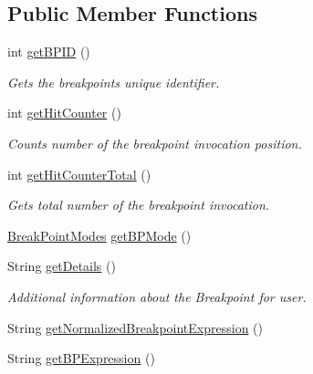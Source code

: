 \subsection*{Public Member Functions}
\begin{DoxyCompactItemize}
\item 
int \hyperlink{interfacegov_1_1nasa_1_1jpf_1_1inspector_1_1interfaces_1_1_break_point_status_ae3bec2407b923c2e640eec695a9bbe64}{get\+B\+P\+ID} ()
\begin{DoxyCompactList}\small\item\em Gets the breakpoint\textquotesingle{}s unique identifier. \end{DoxyCompactList}\item 
int \hyperlink{interfacegov_1_1nasa_1_1jpf_1_1inspector_1_1interfaces_1_1_break_point_status_aa58761be50e0e0ecb7d6a7fb3ded8bf9}{get\+Hit\+Counter} ()
\begin{DoxyCompactList}\small\item\em Counts number of the breakpoint invocation position. \end{DoxyCompactList}\item 
int \hyperlink{interfacegov_1_1nasa_1_1jpf_1_1inspector_1_1interfaces_1_1_break_point_status_abdf0e6a13c2758d552a9d74f1dbc33e2}{get\+Hit\+Counter\+Total} ()
\begin{DoxyCompactList}\small\item\em Gets total number of the breakpoint invocation. \end{DoxyCompactList}\item 
\hyperlink{enumgov_1_1nasa_1_1jpf_1_1inspector_1_1server_1_1breakpoints_1_1_break_point_modes}{Break\+Point\+Modes} \hyperlink{interfacegov_1_1nasa_1_1jpf_1_1inspector_1_1interfaces_1_1_break_point_status_a34108750e104d20827540014f408424c}{get\+B\+P\+Mode} ()
\item 
String \hyperlink{interfacegov_1_1nasa_1_1jpf_1_1inspector_1_1interfaces_1_1_break_point_status_abf7d5b295fb4bbd41565231b43ff8593}{get\+Details} ()
\begin{DoxyCompactList}\small\item\em Additional information about the Breakpoint for user. \end{DoxyCompactList}\item 
String \hyperlink{interfacegov_1_1nasa_1_1jpf_1_1inspector_1_1interfaces_1_1_break_point_status_a297c8455f6e0f6cbe9313c8007da20de}{get\+Normalized\+Breakpoint\+Expression} ()
\item 
String \hyperlink{interfacegov_1_1nasa_1_1jpf_1_1inspector_1_1interfaces_1_1_break_point_creation_information_aa7da9b019da9ee304abd59759f73d14e}{get\+B\+P\+Expression} ()

\end{DoxyCompactItemize}
